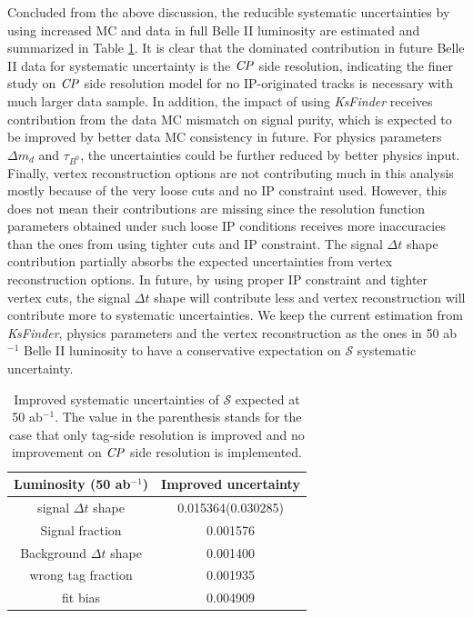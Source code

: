 Concluded from the above discussion, the reducible systematic uncertainties by using increased MC and data in full Belle II luminosity are estimated and summarized in Table \ref{tab:reducedsys}. It is clear that the dominated contribution in future Belle II data for systematic uncertainty is the $\it{CP}$ side resolution, indicating the finer study on $\it{CP}$ side resolution model for no IP-originated tracks is necessary with much larger data sample.
In addition, the impact of using \textit{KsFinder} receives contribution from the data MC mismatch on signal purity, which is expected to be improved by better data MC consistency in future. For physics parameters $\Delta m_d$ and $\tau_{B^0}$, the uncertainties could be further reduced by better physics input. Finally, vertex reconstruction options are not contributing much in this analysis mostly because of the very loose cuts and no IP constraint used. However, this does not mean their contributions are missing since the resolution function parameters obtained under such loose IP conditions receives more inaccuracies than the ones from using tighter cuts and IP constraint. The signal $\Delta t$ shape contribution partially absorbs the expected uncertainties from vertex reconstruction options. In future, by using proper IP constraint and tighter vertex cuts, the signal $\Delta t$ shape will contribute less and vertex reconstruction will contribute more to systematic uncertainties. We keep the current estimation from \textit{KsFinder}, physics parameters and the vertex reconstruction as the ones in 50 ab$^{-1}$ Belle II luminosity to have a conservative expectation on $\mathcal{S}$ systematic uncertainty.

\begin{table}[htpb]
	\centering
	\caption{ Improved systematic uncertainties of $\mathcal{S}$ expected at 50 ab$^{-1}$. The value in the parenthesis stands for the case that only tag-side resolution is improved and no improvement on $\it{CP}$ side resolution is implemented. }
	\label{tab:reducedsys}
	\begin{tabular}{c| c}
		\hline
		Luminosity (50 ab$^{-1}$) & Improved uncertainty \\
		\hline
		signal $\Delta t$ shape &  0.015364(0.030285)\\
		Signal fraction &  0.001576 \\
		Background $\Delta t$ shape &  0.001400\\
		wrong tag fraction &  0.001935\\
		fit bias &  0.004909\\
		\hline
	\end{tabular}
\end{table}


